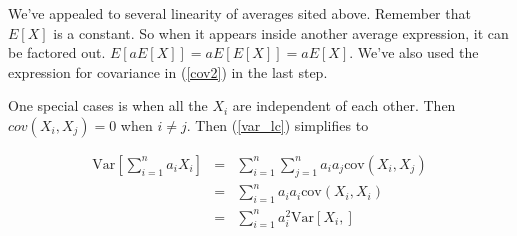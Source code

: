 \documentclass[]{article}
\begin{document}
We've appealed to several linearity of averages sited above.
Remember that $E[X]$ is a constant.  So when it appears inside
another average expression, it can be factored out.
$E[ a E[X]] = aE[E[X]] = aE[X]$.
We've also used the expression for covariance in (\ref{cov2})
in the last step.

One special cases is when all the ${X_i}$ are independent of
each other.  Then $cov(X_i, X_j) = 0$ when $i \ne j$.  Then
(\ref{var_lc}) simplifies to

\begin{eqnarray}
\mbox{Var}\left[ \sum_{i=1}^n a_i X_i \right] &= &\sum_{i=1}^n 
        \sum_{j=1}^n a_i a_j \mbox{cov}(X_i, X_j) \nonumber \\
  &= &\sum_{i=1}^n a_i a_i \mbox{cov}(X_i, X_i) \nonumber \\
  &= &\sum_{i=1}^n a_i^2 \mbox{Var}[X_i,] \label{var_lc_indep}
\end{eqnarray}
\end{document}

